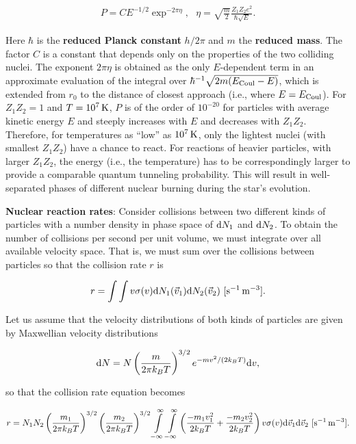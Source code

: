 \documentclass[a4paper,10pt]{article}
\begin{document}
\begin{align*}
    P = CE^{-1/2}\exp^{-2\pi\eta}, ~~~ \eta=\sqrt{\frac{m}{2}}\frac{Z_1Z_2e^2}{\hbar\sqrt{E}}.
\end{align*}

{\noindent}Here $\hbar$ is the \textbf{reduced Planck constant} $h/2\pi$ and $m$ the \textbf{reduced mass}. The factor $C$ is a constant that depends only on the properties of the two colliding nuclei. The exponent $2\pi\eta$ is obtained as the only $E$-dependent term in an approximate evaluation of the integral over $\hbar^{-1}\sqrt{2m(E_{\rm Coul}-E)}$, which is extended from $r_0$ to the distance of closest approach (i.e., where $E=E_{\rm Coul}$). For $Z_1Z_2=1$ and $T=10^7\,{\rm K}$, $P$ is of the order of $10^{-20}$ for particles with average kinetic energy $E$ and steeply increases with $E$ and decreases with $Z_1Z_2$. Therefore, for temperatures as ``low'' as $10^7\,{\rm K}$, only the lightest nuclei (with smallest $Z_1Z_2$) have a chance to react. For reactions of heavier particles, with larger $Z_1Z_2$, the energy (i.e., the temperature) has to be correspondingly larger to provide a comparable quantum tunneling probability. This will result in well-separated phases of different nuclear burning during the star's evolution.

{\noindent}\textbf{Nuclear reaction rates}: Consider collisions between two different kinds of particles with a number density in phase space of ${\rm d}N_1$ and ${\rm d}N_2$. To obtain the number of collisions per second per unit volume, we must integrate over all available velocity space. That is, we must sum over the collisions between particles so that the collision rate $r$ is

\begin{align*}
    r = \int\int v\sigma(v){\rm d}N_1(\vec{v}_1){\rm d}N_2(\vec{v}_2) ~ [{\rm s^{-1}\,m^{-3}}].
\end{align*}

{\noindent}Let us assume that the velocity distributions of both kinds of particles are given by Maxwellian velocity distributions

\begin{align*}
    {\rm d}N = N \left(\frac{m}{2\pi k_BT}\right)^{3/2} e^{-mv^2/(2k_BT)}{\rm d}v,
\end{align*}

{\noindent}so that the collision rate equation becomes

\begin{align*}
    r = N_1N_2 \left(\frac{m_1}{2\pi k_BT}\right)^{3/2} \left(\frac{m_2}{2\pi k_BT}\right)^{3/2} \int\limits_{-\infty}^\infty \int\limits_{-\infty}^\infty \left(\frac{-m_1v_1^2}{2k_BT}+\frac{-m_2v_2^2}{2k_BT}\right) v\sigma(v){\rm d}\vec{v}_1{\rm d}\vec{v}_2 ~ [{\rm s^{-1}\,m^{-3}}].
\end{align*}
\end{document}
